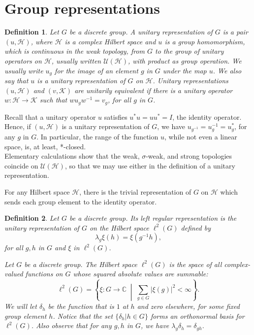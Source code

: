 \documentclass{book}
\newtheorem{definition}{Definition}[section]
\begin{document}
\section{Group representations}
\begin{definition}
  Let \(G\) be a discrete group. A \textnormal{unitary representation} of
  \(G\) is a pair \((u,\mathcal{H})\), where \(\mathcal{H}\) is a complex Hilbert space and \(u\) is a group 
  homomorphism, which is continuous in the weak topology, from \(G\) to the group of unitary operators on \(\mathcal{H}\), usually written
  \(\mathcal{U}(\mathcal{H})\), with product as group operation. We usually write \(u_g\) for the image of
  an element \(g\) in \(G\) under the map \(u\). We also say that \(u\) is a unitary 
  representation of \(G\) on \(\mathcal{H}\). Unitary representations \((u,\mathcal{H})\) and \((v,\mathcal{K})\) are \textnormal{unitarily
  equivalent} if there is a unitary operator \(w : \mathcal{H} \rightarrow \mathcal{K}\) such that \(wu_g w^{-1} = v_g\),
  for all \(g\) in \(G\).
\end{definition}
Recall that a unitary operator \(u\) satisfies \(u^*u = uu^* = I\), the identity
operator. Hence, if \((u,\mathcal{H})\) is a unitary representation of \(G\), we have
\(u_{g^{-1}}=u_g^{-1}=u_g^*\), for any \(g\) in \(G\). In particular, the range of the function \(u\), while
not even a linear space, is, at least, *-closed.\\
Elementary calculations show that the weak, \(\sigma\)-weak, and strong topologies coincide on \(\mathcal{U}(\mathcal{H})\), 
so that we may use either in the definition of a unitary representation.\par
For any Hilbert space \(\mathcal{H}\), there is the trivial representation of \(G\) on \(\mathcal{H}\)
which sends each group element to the identity operator.
\begin{definition}
  Let \(G\) be a discrete group. Its \textnormal{left regular representation}
  is the unitary representation of \(G\) on the Hilbert space \(\ell^2(G)\) defined by
  \[\lambda_g \xi(h) = \xi(g^{-1}h),\]
  for all \(g,h\) in \(G\) and \(\xi\) in \(\ell^2(G)\).\par
  Let \(G\) be a discrete group. The Hilbert space \(\ell^{2}(G)\) 
  is the space of all complex-valued functions on \(G\) whose squared absolute values are summable:
  \[
  \ell^{2}(G)
  =
  \left\{
  \xi : G \to \mathbb{C}
  \;\middle|\;
  \sum_{g \in G} |\xi(g)|^{2} < \infty
  \right\}.
  \]
  We will let \(\delta_h\) be the function that is \(1\) at \(h\)
  and zero elsewhere, for some fixed group element \(h\). Notice that the set
  \(\{\delta_h | h \in G\}\) forms an orthonormal basis for \(\ell^2(G)\). Also observe that for any
  \(g, h\) in \(G\), we have \(\lambda_g\delta_h = \delta_{gh}\).
\end{definition}
\end{document}
